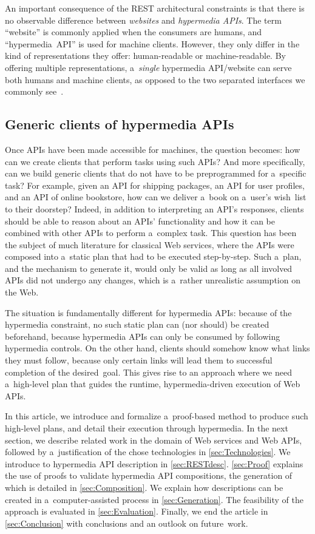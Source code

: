 An important consequence of the REST architectural constraints
is that there is no observable difference
between \emph{websites} and \emph{hypermedia APIs}.
The term \enquote{website} is commonly applied when the consumers are humans,
and \enquote{hypermedia~API} is used for machine clients.
However, they only differ in the kind of representations they offer:
human-readable or machine-readable.
By offering multiple representations,
a~\emph{single} hypermedia API/website can serve
both humans and machine clients,
as opposed to the two separated interfaces we commonly see~\cite{verborgh_jod_2014}.

\subsection{Generic clients of hypermedia APIs}\label{API_comp}
Once APIs have been made accessible for machines,
the question becomes:
how can we create clients that perform tasks using such APIs?
And more specifically,
can we build generic clients that do not have to be preprogrammed
for a~specific task?
For example, given an API for shipping packages,
an API for user profiles, and an API of online bookstore,
how can we deliver a~book on a~user's wish~list to their doorstep?
Indeed, in addition to interpreting an API's responses,
clients should be able to reason about an APIs' functionality
and how it can be combined with other APIs to perform a~complex task.
This question has been the subject of much literature
for classical Web services,
where the APIs were composed into a~static plan
that had to be executed step-by-step.
Such a~plan, and the mechanism to generate it, would only be valid
as long as all involved APIs did not undergo any changes,
which is a~rather unrealistic assumption on the Web.

The situation is fundamentally different for hypermedia APIs:
because of the hypermedia constraint,
no such static plan can (nor should) be created beforehand,
because hypermedia APIs can only be consumed by following hypermedia controls.
On the other hand, clients should somehow know
what links they must follow,
because only certain links will lead them
to successful completion of the desired~goal.
This gives rise to an approach where we need a~high-level plan
that guides the runtime, hypermedia-driven execution of Web APIs.

In this article, we introduce and formalize a~proof-based method
to produce such high-level plans,
and detail their execution through hypermedia.
In the next section,
we describe related work in the domain of Web services and Web APIs,
followed by a~justification of the chose technologies in \cref{sec:Technologies}.
We introduce to hypermedia API description in \cref{sec:RESTdesc}.
\cref{sec:Proof} explains the use of proofs
to validate hypermedia API compositions,
the generation of which is detailed in \cref{sec:Composition}.
We explain how descriptions can be created in a~computer-assisted process
in \cref{sec:Generation}.
The feasibility of the approach is evaluated in \cref{sec:Evaluation}.
Finally, we end the article in \cref{sec:Conclusion} with conclusions
and an outlook on future~work.


